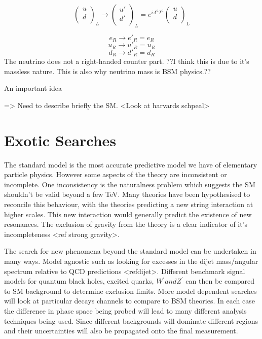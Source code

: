   \begin{equation}
     \begin{pmatrix}
         u \\
         d \\
        \end{pmatrix}_{L}
        \rightarrow
      \begin{pmatrix}
         u'\\
         d' \\
        \end{pmatrix}_L
        	=e^{i\Lambda^{a}T^{a}}
	\begin{pmatrix}
         u \\
         d \\
        \end{pmatrix}_L
 \end{equation}
 
   \begin{equation}
e_R  \rightarrow e'_R = e_R 
 \end{equation}
    \begin{equation}
u_R  \rightarrow u'_R = u_R 
 \end{equation}
     \begin{equation}
d_R  \rightarrow d'_R = d_R 
 \end{equation}
The neutrino does not a right-handed counter part. ??I think this is due to it's massless nature. This is also why neutrino mass is BSM physics.??  

An important idea 

=> Need to describe briefly the SM.  <Look at harvards schpeal> 


\section{Exotic Searches}
The standard model is the most accurate predictive model we have of elementary particle physics. However some aspects of the theory are inconsistent or incomplete.  
One inconsistency is the naturalness problem which suggests the SM shouldn't be valid beyond a few TeV. Many theories have been hypothesised to reconcile this behaviour, with the theories predicting a new string interaction at higher scales. This new interaction would generally predict the existence of new resonances.
The exclusion of gravity from the theory is a clear indicator of it's incompleteness <ref strong gravity>.  

The search for new phenomena beyond the standard model can be undertaken in many ways. Model agnostic such as looking for excesses in the dijet mass/angular spectrum relative to QCD predictions <refdijet>.  Different benchmark signal models for quantum black holes, excited quarks, $W^{'} and Z^{'}$ can then be compared to SM background to determine exclusion limits. More model dependent searches will look at particular decays channels to compare to BSM theories. In each case the difference in phase space being probed will lead to many different analysis techniques being used. Since different backgrounds will dominate different regions and their uncertainties will also be propagated onto the final measurement. 



